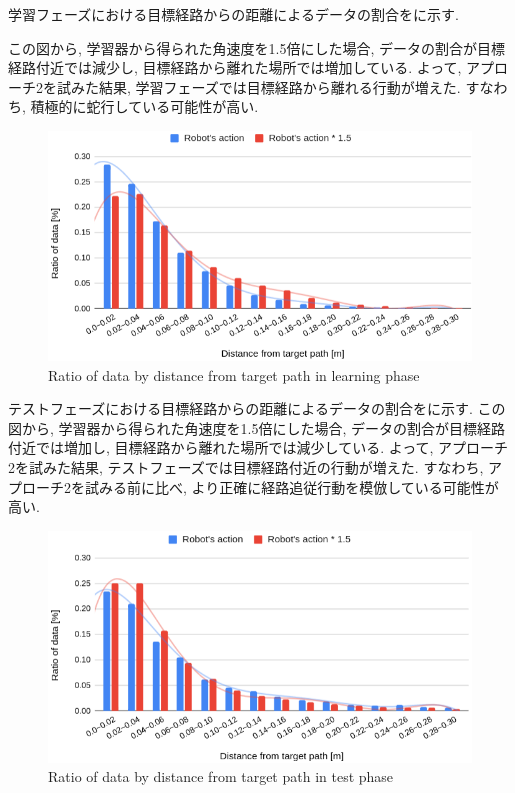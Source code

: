 \begin{itemize}
  学習フェーズにおける目標経路からの距離によるデータの割合をに示す. \par
  この図から, 学習器から得られた角速度を1.5倍にした場合, データの割合が目標経路付近では減少し, 目標経路から離れた場所では増加している. よって, アプローチ2を試みた結果, 学習フェーズでは目標経路から離れる行動が増えた. すなわち, 積極的に蛇行している可能性が高い.


  \begin{figure}[hbtp]
    \centering
   \includegraphics[keepaspectratio, scale=0.37]
        {images/hist_act_training.png}
   \caption{Ratio of data by distance from target path in learning phase}
   \label{Fig:hist_act_training}
  \end{figure}  


  テストフェーズにおける目標経路からの距離によるデータの割合をに示す. この図から, 学習器から得られた角速度を1.5倍にした場合, データの割合が目標経路付近では増加し, 目標経路から離れた場所では減少している. よって, アプローチ2を試みた結果, テストフェーズでは目標経路付近の行動が増えた. すなわち, アプローチ2を試みる前に比べ, より正確に経路追従行動を模倣している可能性が高い.

  \begin{figure}[hbtp]
    \centering
   \includegraphics[keepaspectratio, scale=0.37]
        {images/hist_act_test.png}
   \caption{Ratio of data by distance from target path in test phase}
   \label{Fig:hist_act_test}
  \end{figure}  


\end{itemize}

